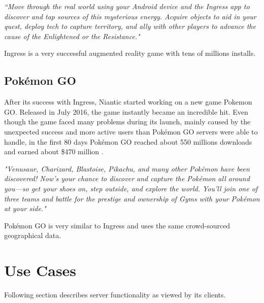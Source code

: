 	\textit{``Move through the real world using your Android device and the Ingress app to discover and tap sources of this mysterious energy. Acquire objects to aid in your quest, deploy tech to capture territory, and ally with other players to advance the cause of the Enlightened or the Resistance."} \cite{ingress}
	
	Ingress is a very successful augmented reality game with tens of millions installs.
	
	\subsection{Pokémon GO}
	After its success with Ingress, Niantic started working on a new game Pokemon GO. Released in July 2016, the game instantly became an incredible hit. Even though the game faced many problems during its launch, mainly caused by the unexpected success and more active users than Pokémon	GO servers were able to handle, in the first 80 days Pokémon GO reached about 550 millions downloads and earned about \$470 million \cite{pokemongosuccess}.
	
	\textit{"Venusaur, Charizard, Blastoise, Pikachu, and many other Pokémon have been discovered! Now’s your chance to discover and capture the Pokémon all around you—so get your shoes on, step outside, and explore the world. You’ll join one of three teams and battle for the prestige and ownership of Gyms with your Pokémon at your side."} \cite{pokemongo}
		
	Pokémon GO is very similar to Ingress and uses the same crowd-sourced geographical data.
	
\section{Use Cases}
Following section describes server functionality as viewed by its clients.

